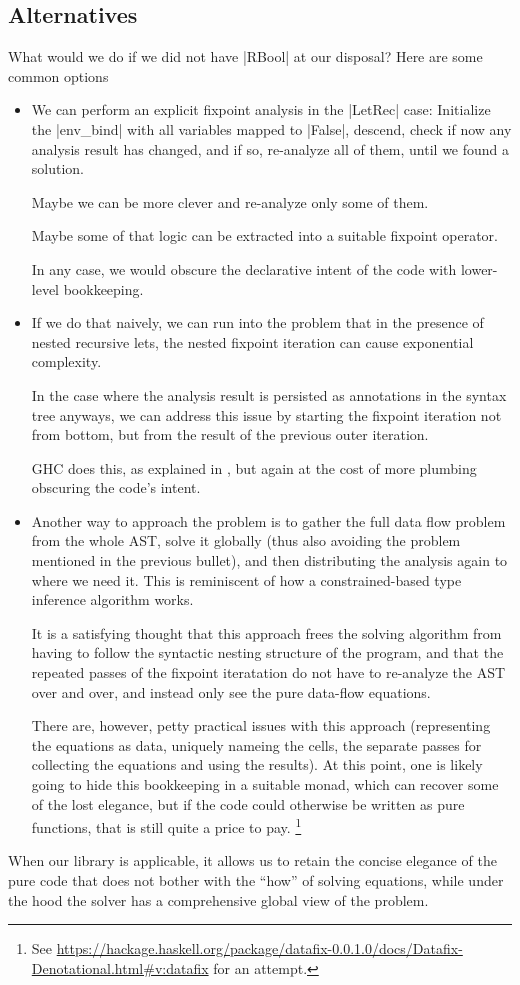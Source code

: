 \documentclass[manuscript,anonymous,screen,acmsmall]{acmart}
\begin{document}
\subsection{Alternatives}
What would we do if we did not have |RBool| at our disposal? Here are some common options
\begin{itemize}
\item We can perform an explicit fixpoint analysis in the |LetRec| case: Initialize the |env_bind| with all variables mapped to |False|, descend, check if now any analysis result has changed, and if so, re-analyze all of them, until we found a solution.

Maybe we can be more clever and re-analyze only some of them.

Maybe some of that logic can be extracted into a suitable fixpoint operator.

In any case, we would obscure the declarative intent of the code with lower-level bookkeeping.

\item If we do that naively, we can run into the problem that in the presence of nested recursive lets, the nested fixpoint iteration can cause exponential complexity.

In the case where the analysis result is persisted as annotations in the syntax tree anyways, we can address this issue by starting the fixpoint iteration not from bottom, but from the result of the previous outer iteration.

GHC does this, as explained in \citet[Section 6.6]{modular}, but again at the cost of more plumbing obscuring the code's intent.

\item Another way to approach the problem is to gather the full data flow problem from the whole AST, solve it globally (thus also avoiding the problem mentioned in the previous bullet), and then distributing the analysis again to where we need it. This is reminiscent of how a constrained-based type inference algorithm works.

It is a satisfying thought that this approach frees the solving algorithm from having to follow the syntactic nesting structure of the program, and that the repeated passes of the fixpoint iteratation do not have to re-analyze the AST over and over, and instead only see the pure data-flow equations.

There are, however, petty practical issues with this approach (representing the equations as data, uniquely nameing the cells, the separate passes for collecting the equations and using the results).
At this point, one is likely going to hide this bookkeeping in a suitable monad, which can recover some of the lost elegance, but if the code could otherwise be written as pure functions, that is still quite a price to pay.%
\footnote{See \url{https://hackage.haskell.org/package/datafix-0.0.1.0/docs/Datafix-Denotational.html\#v:datafix} for an attempt.}
\end{itemize}
When our library is applicable, it allows us to retain the concise elegance of the pure code that does not bother with the “how” of solving equations, while under the hood the solver has a comprehensive global view of the problem.
\end{document}
